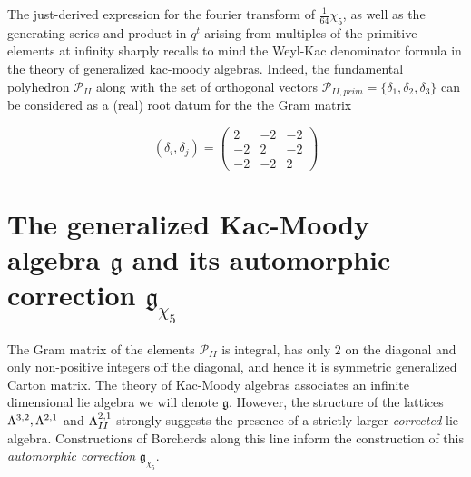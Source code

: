 \documentclass[9pt]{amsart} \usepackage[utf8]{inputenc}
\newcommand{\Poly}{\mathcal{P}}
\newcommand{\bkm}{\mathfrak{g}}
\newcommand{\autcor}{\mathfrak{g}_{\chi_5}}
\begin{document}
The just-derived expression for the fourier transform of $\frac{1}{64}
\chi_5$, as well as the generating series and product in $q^t$ arising
from multiples of the primitive elements at infinity sharply recalls to
mind the Weyl-Kac denominator formula in the theory of generalized
kac-moody algebras. Indeed, the fundamental polyhedron $\Poly_{II}$
along with the set of orthogonal vectors $\Poly_{II,prim} =
\{\delta_1,\delta_2,\delta_3\}$ can be considered as a (real) root datum
for
the the Gram matrix

$$(\delta_i,\delta_j) = \begin{pmatrix}2 & -2 & -2\\-2 & 2 & -2\\-2 & -2
& 2\end{pmatrix}$$

\section{The generalized Kac-Moody algebra $\bkm$ and its automorphic
correction $\autcor$}

The Gram matrix of the elements $\Poly_{II}$ is integral, has only $2$
on the diagonal and only non-positive integers off the diagonal, and
hence it is symmetric generalized Carton matrix. The theory of Kac-Moody
algebras associates an infinite dimensional lie algebra we will denote
$\bkm$. However, the structure of the lattices
$\Lambda^{3,2}, \Lambda^{2,1}$ and $\Lambda^{2,1}_{II}$ strongly suggests the
presence of a strictly larger \textit{corrected} lie algebra.
Constructions of Borcherds along this line inform the construction of
this \textit{automorphic correction} $\autcor$.
\end{document}
